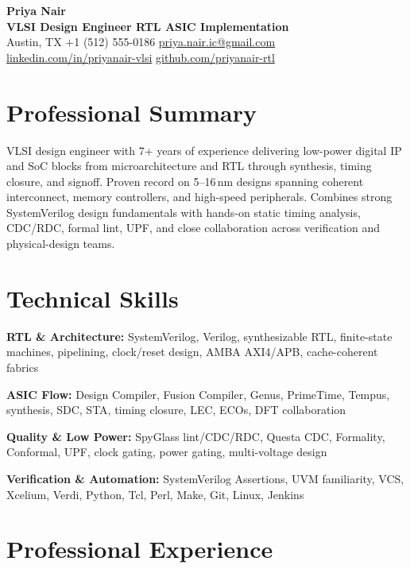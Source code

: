 \documentclass[10pt,letterpaper]{article}
\newcommand{\skill}[2]{%
  \textbf{\color{siliconnavy}#1:} #2\par
}
\begin{document}
\color{black}
\fontsize{9.3pt}{10.7pt}\selectfont

\begin{center}
  {\fontsize{23}{25}\selectfont\bfseries\color{siliconnavy} Priya Nair}\\[1pt]
  {\large\bfseries\color{signalblue} VLSI Design Engineer \textbar{} RTL \textbar{} ASIC Implementation}\\[3pt]
  {\small
    Austin, TX \enspace\textcolor{rulegray}{\textbar}\enspace
    +1 (512) 555-0186 \enspace\textcolor{rulegray}{\textbar}\enspace
    \href{mailto:priya.nair.ic@gmail.com}{priya.nair.ic@gmail.com} \enspace\textcolor{rulegray}{\textbar}\enspace
    \href{https://www.linkedin.com/in/priyanair-vlsi}{linkedin.com/in/priyanair-vlsi} \enspace\textcolor{rulegray}{\textbar}\enspace
    \href{https://github.com/priyanair-rtl}{github.com/priyanair-rtl}
  }
\end{center}
\vspace{-3pt}

\section*{Professional Summary}
VLSI design engineer with 7+ years of experience delivering low-power digital IP and SoC blocks from microarchitecture and RTL through synthesis, timing closure, and signoff. Proven record on 5--16\,nm designs spanning coherent interconnect, memory controllers, and high-speed peripherals. Combines strong SystemVerilog design fundamentals with hands-on static timing analysis, CDC/RDC, formal lint, UPF, and close collaboration across verification and physical-design teams.

\section*{Technical Skills}
\skill{RTL \& Architecture}{SystemVerilog, Verilog, synthesizable RTL, finite-state machines, pipelining, clock/reset design, AMBA AXI4/APB, cache-coherent fabrics}
\skill{ASIC Flow}{Design Compiler, Fusion Compiler, Genus, PrimeTime, Tempus, synthesis, SDC, STA, timing closure, LEC, ECOs, DFT collaboration}
\skill{Quality \& Low Power}{SpyGlass lint/CDC/RDC, Questa CDC, Formality, Conformal, UPF, clock gating, power gating, multi-voltage design}
\skill{Verification \& Automation}{SystemVerilog Assertions, UVM familiarity, VCS, Xcelium, Verdi, Python, Tcl, Perl, Make, Git, Linux, Jenkins}

\section*{Professional Experience}
\end{document}
